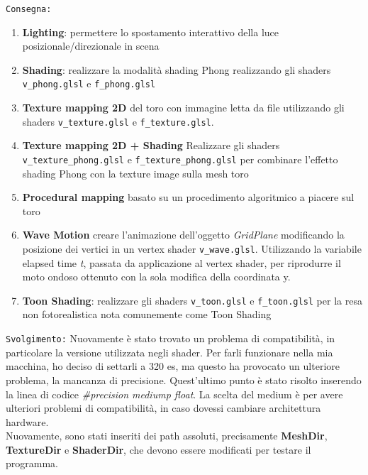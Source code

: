 \texttt{Consegna:}
\begin{enumerate}
    \item \textbf{Lighting}: permettere lo spostamento interattivo della luce posizionale/direzionale in scena
    \item \textbf{Shading}: realizzare la modalità shading Phong realizzando gli shaders \texttt{v\_phong.glsl} e \texttt{f\_phong.glsl} 
    \item \textbf{Texture mapping 2D} del toro con immagine letta da file utilizzando gli shaders \texttt{v\_texture.glsl} e \texttt{f\_texture.glsl}.
    \item \textbf{Texture mapping 2D + Shading} Realizzare gli shaders \texttt{v\_texture\_phong.glsl} e \texttt{f\_texture\_phong.glsl} per combinare l'effetto shading Phong con la texture image sulla mesh toro
    \item \textbf{Procedural mapping} basato su un procedimento algoritmico a piacere sul toro
    \item \textbf{Wave Motion} creare l'animazione dell'oggetto \textit{GridPlane} modificando la posizione dei vertici in un vertex shader \texttt{v\_wave.glsl}. Utilizzando la variabile elapsed time \textit{t}, passata da applicazione al vertex shader, per riprodurre il moto ondoso ottenuto con la sola modifica della coordinata y.
    \item \textbf{Toon Shading}: realizzare gli shaders \texttt{v\_toon.glsl} e \texttt{f\_toon.glsl} per la resa non fotorealistica nota comunemente come Toon Shading
    
\end{enumerate}
\texttt{Svolgimento:}
Nuovamente è stato trovato un problema di compatibilità, in particolare la versione utilizzata negli shader. Per farli funzionare nella mia macchina, ho deciso di settarli a 320 es, ma questo ha provocato un ulteriore problema, la mancanza di precisione. Quest'ultimo punto è stato risolto inserendo la linea di codice \textit{\#precision mediump float}. La scelta del medium è per avere ulteriori problemi di compatibilità, in caso dovessi cambiare architettura hardware.\\ Nuovamente, sono stati inseriti dei path assoluti, precisamente \textbf{MeshDir}, \textbf{TextureDir} e \textbf{ShaderDir}, che devono essere modificati per testare il programma.
